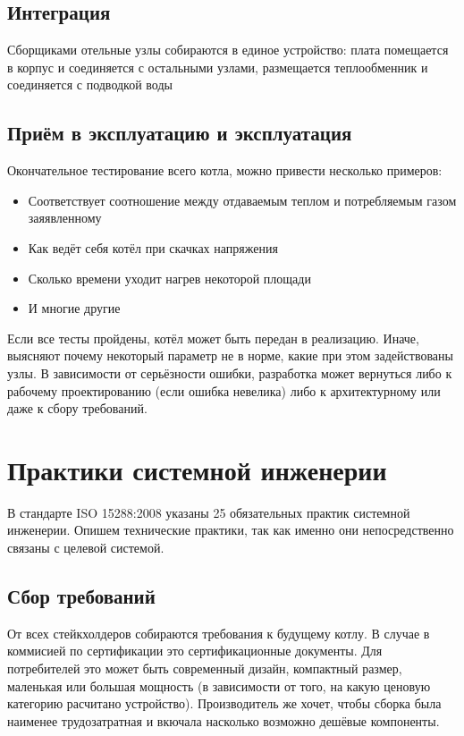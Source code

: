 \documentclass[bibliography=totocnumbered]{scrartcl}
\begin{document}
\subsection{Интеграция}
Сборщиками отельные узлы собираются в единое устройство: плата помещается в корпус и соединяется с остальными узлами, размещается теплообменник и соединяется с подводкой воды

\subsection{Приём в эксплуатацию и эксплуатация}
Окончательное тестирование всего котла, можно привести несколько примеров:

\begin{itemize}
  \item Соответствует соотношение между отдаваемым теплом и потребляемым газом заяявленному
  \item Как ведёт себя котёл при скачках напряжения
  \item Сколько времени уходит нагрев некоторой площади
  \item И многие другие
\end{itemize}
Если все тесты пройдены, котёл может быть передан в реализацию. Иначе, выясняют почему некоторый параметр не в норме, какие при этом задействованы узлы. В зависимости от серьёзности ошибки, разработка может вернуться либо к рабочему проектированию (если ошибка невелика) либо к архитектурному или даже к сбору требований.

\section{Практики системной инженерии}
В стандарте ISO 15288:2008 указаны 25 обязательных практик системной инженерии. Опишем технические практики, так как именно они непосредственно связаны с целевой системой.

\subsection{Сбор требований}
От всех стейкхолдеров собираются требования к будущему котлу. В случае в коммисией по сертификации это сертификационные документы. Для потребителей это может быть современный дизайн, компактный размер, маленькая или большая мощность (в зависимости от того, на какую ценовую категорию расчитано устройство). Производитель же хочет, чтобы сборка была наименее трудозатратная и вкючала насколько возможно дешёвые компоненты.
\end{document}
